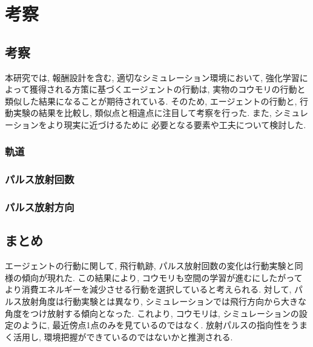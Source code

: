 \documentclass[../main]{subfiles}
\begin{document}
\newpage
\chapter{考察}
\label{chap:result}

\section{考察}
本研究では, 報酬設計を含む, 適切なシミュレーション環境において, 
強化学習によって獲得される方策に基づくエージェントの行動は, 
実物のコウモリの行動と類似した結果になることが期待されている.
そのため, エージェントの行動と, 行動実験の結果を比較し, 
類似点と相違点に注目して考察を行った. 
また, シミュレーションをより現実に近づけるために
必要となる要素や工夫について検討した.

\subsection{軌道}

\subsection{パルス放射回数}

\subsection{パルス放射方向}

\section{まとめ}
エージェントの行動に関して, 飛行軌跡, 
パルス放射回数の変化は行動実験と同様の傾向が現れた.
この結果により,
コウモリも空間の学習が進むにしたがって
より消費エネルギーを減少させる行動を選択していると考えられる.
対して, パルス放射角度は行動実験とは異なり, 
シミュレーションでは飛行方向から大きな角度をつけ放射する傾向となった.
これより, コウモリは, シミュレーションの設定のように, 
最近傍点1点のみを見ているのではなく.
放射パルスの指向性をうまく活用し, 
環境把握ができているのではないかと推測される.

    
\end{document}
